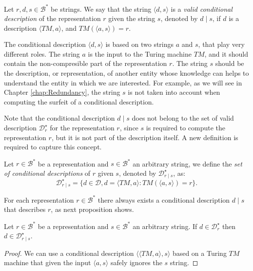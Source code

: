 \begin{definition}
Let $r, d, s \in \mathcal{B}^\ast$ be strings. We say that the string $\langle d, s \rangle$ is a \emph{valid conditional description} of the representation $r$ given the string $s$, denoted by $d \mid s$, if $d$ is a description $\langle TM, a \rangle$, and $TM \left(\langle a, s \rangle \right) = r$.
\end{definition}

The conditional description $\langle d, s \rangle$ is based on two strings $a$ and $s$, that play very different roles. The string $a$ is the input to the Turing machine $TM$,  and it should contain the non-compresible part of the representation $r$. The string $s$ should be the description, or representation, of another entity whose knowledge can helps to understand the entity in which we are interested. For example, as we will see in Chapter \ref{chap:Redundancy}, the string $s$ is not taken into account when computing the surfeit of a conditional description.

Note that the conditional description $d \mid s$ does not belong to the set of valid description $\mathcal{D}^\star_r$ for the representation $r$, since $s$ is required to compute the representation $r$, but it is not part of the description itself. A new definition is required to capture this concept.

\begin{definition}
Let $r \in \mathcal{B}^\ast$ be a representation and $s \in \mathcal{B}^\ast$ an arbitrary string, we define the \emph{set of conditional descriptions} of $r$ given $s$, denoted by $\mathcal{D}_{r \mid s}^\star$, as:
\[
\mathcal{D}_{r \mid s}^\star = \{ d \in \mathcal{D}, d = \langle TM, a \rangle : TM \left(\langle a, s \rangle \right) = r \}.
\]
\end{definition}

For each representation $r \in \mathcal{B}^\ast$ there always exists a conditional description $d \mid s$ that describes $r$, as next proposition shows.

\begin{proposition}
Let $r \in \mathcal{B}^\ast$ be a representation and $s \in \mathcal{B}^\ast$ an arbitrary string. If $d \in \mathcal{D}_{r}^\star$ then $d \in \mathcal{D}_{r \mid s}^\star$.
\end{proposition}
\begin{proof}
We can use a conditional description $\langle \langle TM, a \rangle, s \rangle$ based on a Turing $TM$ machine that given the input $\langle a, s \rangle$ safely ignores the $s$ string.
\end{proof}

